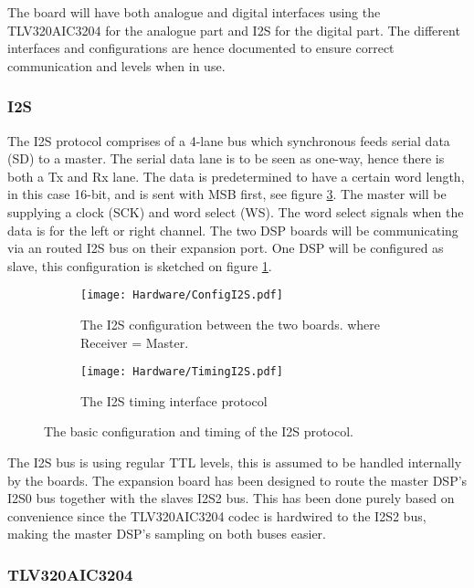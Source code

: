 The board will have both analogue and digital interfaces using the TLV320AIC3204 for the analogue part and I2S for the digital part. The different interfaces and configurations are hence documented to ensure correct communication and levels when in use. 

\subsubsection*{I2S}

The I2S protocol comprises of a 4-lane bus which synchronous feeds serial data (SD) to a master. The serial data lane is to be seen as one-way, hence there is both a Tx and Rx lane. The data is predetermined to have a certain word length, in this case 16-bit, and is sent with MSB first, see figure \ref{fig:I2STiming}. The master will be supplying a clock (SCK) and word select (WS). The word select signals when the data is for the left or right channel. The two DSP boards will be communicating via an routed I2S bus on their expansion port. One DSP will be configured as slave, this configuration is sketched on figure \ref{fig:I2Sconfig}. 

\begin{figure}[H]
	\centering
	\begin{subfigure}[b]{.45\textwidth}
		\centering
		\texttt{[image: Hardware/ConfigI2S.pdf]}
		\caption{The I2S configuration between the two boards. where Receiver = Master.}
		\label{fig:I2Sconfig}
	\end{subfigure}
	\hfill
	\begin{subfigure}[b]{.45\textwidth}
		\centering
		\texttt{[image: Hardware/TimingI2S.pdf]}
		\caption{The I2S timing interface protocol}
		\label{fig:I2STiming}
	\end{subfigure}	
	\caption{The basic configuration and timing of the I2S protocol.}
\end{figure}

The I2S bus is using regular TTL levels, this is assumed to be handled internally by the boards. The expansion board has been designed to route the master DSP's I2S0 bus together with the slaves I2S2 bus. This has been done purely based on convenience since the TLV320AIC3204 codec is hardwired to the I2S2 bus, making the master DSP's sampling on both buses easier.

\subsubsection*{TLV320AIC3204}

